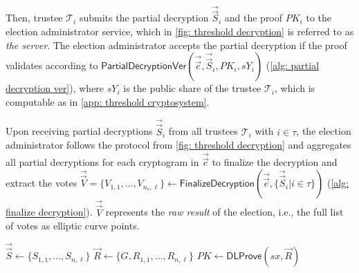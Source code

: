 Then, trustee $\mathcal{T}_i$ submits the partial decryption $\vec{\vec{S}}_i$ and the proof $PK_i$ to the election administrator service, which in \cref{fig: threshold decryption} is referred to as \textit{the server}. The election administrator accepts the partial decryption if the proof validates according to $\mathsf{PartialDecryptionVer}(\vec{\vec{e}}, \vec{\vec{S}}_i, PK_i, sY_i)$ (\cref{alg: partial decryption ver}), where $sY_i$ is the public share of the trustee $\mathcal{T}_i$, which is computable as in \cref{app: threshold cryptosystem}.

Upon receiving partial decryptions $\vec{\vec{S}}_i$ from all trustees $\mathcal{T}_i$ with $i \in \tau$, the election administrator follows the protocol from \cref{fig: threshold decryption} and aggregates all partial decryptions for each cryptogram in $\vec{\vec{e}}$ to finalize the decryption and extract the votes $\vec{\vec{V}} = \{ V_{1, 1}, ..., V_{n_\mathrm{e}, \ell} \} \gets \mathsf{FinalizeDecryption} (\vec{\vec{e}}, \{ \vec{\vec{S}}_i | i \in \tau \})$ (\cref{alg: finalize decryption}). $\vec{\vec{V}}$ represents the \textit{raw result} of the election, i.e., the full list of votes as elliptic curve points.

\begin{algorithm}[ht]
    \DontPrintSemicolon
    \caption{$\mathsf{PartiallyDecryptAndProve}(\vec{\vec{e}}, sx)$}
    \label{alg: partially decrypt and prove}
    
    $\vec{\vec{S}} \gets \{ S_{1, 1}, ..., S_{n, \ell} \}$ \;
    $\vec{R} \gets \{ G, R_{1, 1}, ..., R_{n, \ell} \}$ \;
    $PK \gets \mathsf{DLProve}(sx, \vec{R})$ 
     
\end{algorithm}

